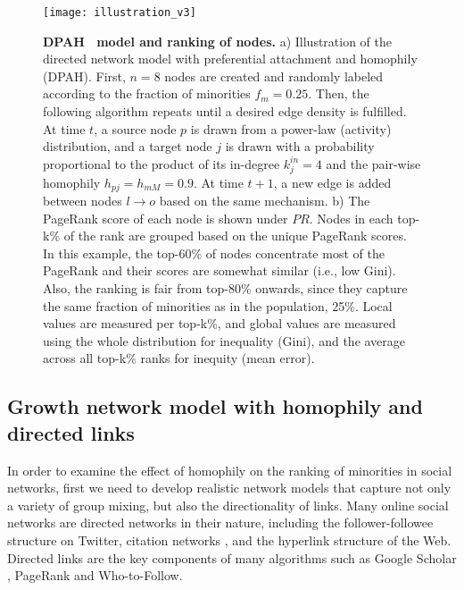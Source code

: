 \documentclass[fleqn,10pt]{wlscirep}
\begin{document}
\begin{figure}[t!]
    \centering
    \texttt{[image: illustration\_v3]}
    \caption{\textbf{{DPAH}~ model and ranking of nodes.} 
    a) Illustration of the directed network model with preferential attachment and homophily ({DPAH}). First, $n=8$ nodes are created and randomly labeled according to the fraction of minorities $f_m=0.25$. Then, the following algorithm repeats until a desired edge density is fulfilled. At time $t$, a source node $p$ is drawn from a power-law (activity) distribution, %
    and a target node $j$ is drawn with a probability proportional to the product of its in-degree $k_j^{in}=4$ %
    and the pair-wise homophily $h_{pj}=h_{mM}=0.9$. At time $t+1$, a new edge is added between %
    nodes $l\rightarrow o$ based on the same mechanism.
    b) The PageRank score of each node is shown under $PR$. Nodes in each top-k\% of the rank are grouped based on the unique PageRank scores. In this example, the top-60\% of nodes concentrate most of the PageRank and their scores are somewhat similar (i.e., low Gini). Also, the ranking is fair from top-80\% onwards, since they capture the same fraction of minorities as in the population, 25\%. 
%
    Local values are measured per top-k\%, and global values are measured using the whole distribution for inequality (Gini), and the average across all top-k\% ranks for inequity (mean error).}
%
    \label{fig:DBAH}
\end{figure}



\subsection*{Growth network model with homophily and directed links}

In order to examine the effect of homophily on the ranking of minorities in social networks, first we need to develop realistic network models that capture not only a variety of group mixing, but also the directionality of links. Many online social networks are directed networks in their nature, including the follower-followee structure on Twitter, citation networks \cite{kong2021first}, and the hyperlink structure of the Web. Directed links are the key components of many algorithms such as Google Scholar \cite{rovira2019ranking}, PageRank and Who-to-Follow. 
\end{document}

